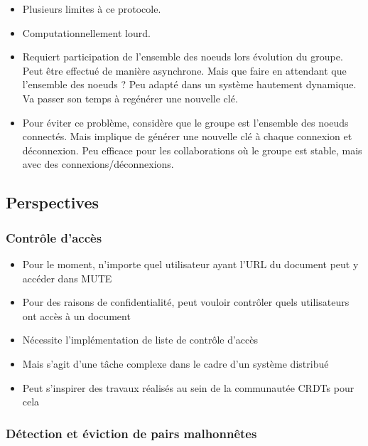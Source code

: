 \documentclass[12pt]{thesul}
\begin{document}
\begin{itemize}
  \item Plusieurs limites à ce protocole.
  \item Computationnellement lourd.
  \item Requiert participation de l'ensemble des noeuds lors évolution du groupe.
    Peut être effectué de manière asynchrone.
    Mais que faire en attendant que l'ensemble des noeuds ?
    Peu adapté dans un système hautement dynamique.
    Va passer son temps à regénérer une nouvelle clé.
  \item Pour éviter ce problème, considère que le groupe est l'ensemble des noeuds connectés.
    Mais implique de générer une nouvelle clé à chaque connexion et déconnexion.
    Peu efficace pour les collaborations où le groupe est stable, mais avec des connexions/déconnexions.
\end{itemize}

\subsection{Perspectives}

\subsubsection{Contrôle d'accès}

\begin{itemize}
  \item Pour le moment, n'importe quel utilisateur ayant l'URL du document peut y accéder dans MUTE
  \item Pour des raisons de confidentialité, peut vouloir contrôler quels utilisateurs ont accès à un document
  \item Nécessite l'implémentation de liste de contrôle d'accès
  \item Mais s'agit d'une tâche complexe dans le cadre d'un système distribué
  \item Peut s'inspirer des travaux réalisés au sein de la communautée \acp{CRDT} \cite{2021-access-control-crdts} pour cela
\end{itemize}

\subsubsection{Détection et éviction de pairs malhonnêtes}
\end{document}

